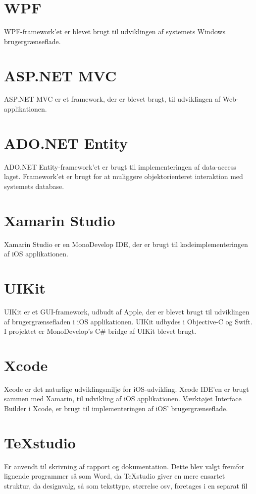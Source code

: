 \section*{WPF}
WPF-framework'et er blevet brugt til udviklingen af systemets Windows brugergrænseflade.

\section*{ASP.NET MVC}
ASP.NET MVC er et framework, der er blevet brugt, til udviklingen af Web-applikationen.

\section*{ADO.NET Entity}
ADO.NET Entity-framework'et er brugt til implementeringen af data-access laget. Framework'et er brugt for at muliggøre objektorienteret interaktion med systemets database.

\section*{Xamarin Studio}
Xamarin Studio er en MonoDevelop IDE, der er brugt til kodeimplementeringen af iOS applikationen.

\section*{UIKit}
UIKit er et GUI-framework, udbudt af Apple, der er blevet brugt til udviklingen af brugergrænsefladen i iOS applikationen. UIKit udbydes i Objective-C og Swift. I projektet er MonoDevelop's C\# bridge af UIKit blevet brugt.

\section*{Xcode}
Xcode er det naturlige udviklingsmiljø for iOS-udvikling. Xcode IDE'en er brugt sammen med Xamarin, til udvikling af iOS applikationen. Værktøjet Interface Builder i Xcode, er brugt til implementeringen af iOS' brugergrænseflade.

\section*{TeXstudio}
Er anvendt til skrivning af rapport og dokumentation. Dette blev valgt fremfor lignende programmer så som Word, da TeXstudio giver en mere ensartet struktur, da designvalg, så som teksttype, størrelse osv, foretages i en separat fil

